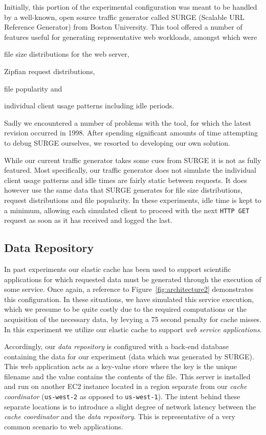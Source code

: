 Initially, this portion of the experimental configuration was meant to be
handled by a well-known, open source traffic generator called SURGE (Scalable
URL Reference Generator) from Boston University\cite{surge}. This tool offered
a number of features useful for generating representative web workloads,
amongst which were
\begin{inparaenum}[(1)]
\item file size distributions for the web server,
\item Zipfian request distributions,
\item file popularity and
\item individual client usage patterns including idle periods.
\end{inparaenum} Sadly we encountered a number of problems with the tool, for
which the latest revision occurred in 1998. After spending significant amounts
of time attempting to debug SURGE ourselves, we resorted to developing our own
solution.

While our current traffic generator takes some cues from SURGE it is not as
fully featured. Most specifically, our traffic generator does not simulate the
individual client usage patterns and idle times are fairly static between
requests. It does however use the same data that SURGE generates for file size
distributions, request distributions and file popularity. In these experiments,
idle time is kept to a minimum, allowing each simulated client to proceed with
the next {\tt HTTP GET} request as soon as it has received and logged the
last.


\subsection{Data Repository} %
\label{sub:data_repository}
In past experiments our elastic cache has been used to support scientific
applications for which requested data must be generated through the execution
of some service. Once again, a reference to Figure~\ref{fig:architecture2}
demonstrates this configuration. In these situations, we have simulated this
service execution, which we presume to be quite costly due to the required
computations or the acquisition of the necessary data, by levying a 75 second
penalty for cache misses. In this experiment we utilize our elastic cache to
support \emph{web service applications}.

Accordingly, our \emph{data repository} is configured with a back-end database
containing the data for our experiment (data which was generated by SURGE).
This web application acts as a key-value store where the key is the unique
filename and the value contains the contents of the file. This server is
installed and run on another EC2 instance located in a region separate from our
\emph{cache coordinator} ({\tt us-west-2} as opposed to {\tt us-west-1}). The
intent behind these separate locations is to introduce a slight degree of
network latency between the \emph{cache coordinator} and the \emph{data
repository}. This is representative of a very common scenario to web
applications.

